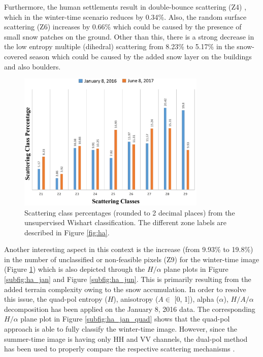 \documentclass[12pt]{elsarticle}
\numberwithin{equation}{section}
\numberwithin{figure}{section}
\numberwithin{table}{section}
\begin{document}
Furthermore, the human settlements result in double-bounce scattering (Z4) \citep{Brunner2009}, which in the winter-time scenario reduces by 0.34\%. Also, the random surface scattering (Z6) increases by 0.66\% which could be caused by the presence of small snow patches on the ground. Other than this, there is a strong decrease in the low entropy multiple (dihedral) scattering from 8.23\% to 5.17\% in the snow-covered season which could be caused by the added snow layer on the buildings and also boulders.

\begin{figure}[htb]
    \centering
    \includegraphics[width=0.8\textwidth]{Figures/Results/Percent.png}
    \caption{\doublespacing Scattering class percentages (rounded to 2 decimal places) from the unsupervised Wishart classification. The different zone labels are described in Figure \ref{fig:ha}.}
    \label{fig:percent}
\end{figure}

Another interesting aspect in this context is the increase (from 9.93\% to 19.8\%) in the number of unclassified or non-feasible pixels (Z9) for the winter-time image (Figure \ref{fig:percent}) which is also depicted through the $H/{\alpha}$ plane plots in Figure \ref{subfig:ha_jan} and Figure \ref{subfig:ha_jun}. This is primarily resulting from the added terrain complexity owing to the snow accumulation. In order to resolve this issue, the quad-pol entropy ($H$), anisotropy ($A \in$ [0, 1]), alpha ($\alpha$), $H/A/{\alpha}$ decomposition has been applied on the January 8, 2016 data. The corresponding $H/{\alpha}$ plane plot in Figure \ref{subfig:ha_jan_quad} shows that the quad-pol approach is able to fully classify the winter-time image. However, since the summer-time image is having only HH and VV channels, the dual-pol method has been used to properly compare the respective scattering mechanisms \citep{Majumdar2019}.
\end{document}
